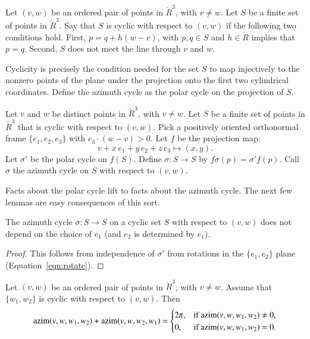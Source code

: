\begin{definition} Let $(v,w)$ be an ordered pair of points in
$\ring{R}^3$, with $v\ne w$.
Let $S$ be a finite set of points in $\ring{R}^3$.
Say that $S$ is cyclic with respect to $(v,w)$ if
the following two conditions hold.
First, $p = q + h (w-v)$, with $p,q\in S$ and $h\in \ring{R}$
implies that $p=q$.  Second, $S$ does not meet the line
through $v$ and $w$.
\end{definition}

Cyclicity is precisely the condition needed for the
set $S$ to map injectively to the nonzero points of the 
plane under the projection
onto the first two cylindrical coordinates.   Define
the azimuth cycle as the polar cycle on the projection of $S$.

\begin{definition}
Let $v$ and $w$ be distinct points in
$\ring{R}^3$, with $v\ne w$.
Let $S$ be a finite set of points in $\ring{R}^3$ that is
cyclic  with respect to $(v,w)$.
Pick a positively oriented orthonormal frame $\{e_1,e_2,e_3\}$
with $e_3\cdot (w-v) > 0$.
Let $f$ be the projection map:
   $$v + x\, e_1 + y\, e_2 + z\, e_3 \mapsto
     (x,y).$$
Let $\sigma'$ be the polar cycle on $f(S)$. Define 
$\sigma:S\to S$ by $f\sigma(p) =\sigma'f(p)$.
Call $\sigma$ the azimuth cycle
on $S$ with respect to $(v,w)$.
\end{definition}

Facts about the polar cycle lift to facts about the azimuth cycle.
The next few lemmas are easy consequences of this sort.


\begin{lemma} The azimuth cycle $\sigma:S\to S$ on
a cyclic set $S$ with respect to $(v,w)$ does not depend
on the choice of $e_1$ (and $e_2$ is determined by $e_1$).
\end{lemma}

\begin{proof} This follows from independence of $\sigma'$ from
rotations in the $\{e_1,e_2\}$ plane  (Equation~\ref{eqn:rotate}).
\end{proof}


\begin{lemma} 
Let $(v,w)$ be an ordered pair of points in $\ring{R}^3$,
with $v\ne w$.  Assume that $\{w_1,w_2\}$ is cyclic
with respect to $(v,w)$.  Then
  $$
  {\operatorname{azim}}(v,w,w_1,w_2) + {\operatorname{azim}}(v,w,w_2,w_1) 
  = \begin{cases} 2\pi, & \text{if }{\operatorname{azim}}(v,w,w_1,w_2)\ne 0,\\
    0, & \text{if }{\operatorname{azim}}(v,w,w_1,w_2)=0.
    \end{cases}
    $$
\end{lemma}

